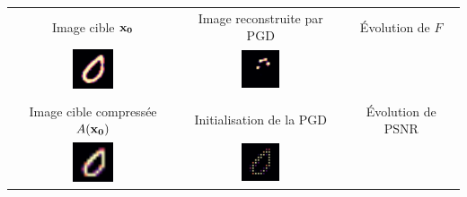\begin{tabular}{c c c}

Image cible $\bf{x_0}$  &  Image reconstruite par PGD  &  Évolution de $F$

\\

\includegraphics[width=0.25\textwidth]{resultats (legacy)/PGD/seed21-target-pas=1e-10_filtre=g-0.6.png}
&
\includegraphics[width=0.25\textwidth]{resultats (legacy)/PGD/seed21-guess-pas=1e-10_filtre=s-None.png}&


\\ \\

Image cible compressée $A(\bf{x_0})$  &  Initialisation de la PGD  & Évolution de PSNR

\\

\includegraphics[width=0.25\textwidth]{resultats (legacy)/PGD/seed21-comptarg-pas=1e-10_filtre=s-None.png}
&
\includegraphics[width=0.25\textwidth]{resultats (legacy)/PGD/seed21-init-pas=1e-10_filtre=s-None.png}
&


\end{tabular}